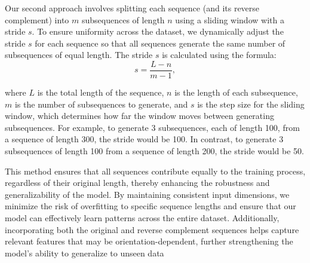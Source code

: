 Our second approach involves splitting each sequence (and its reverse complement) into $m$ subsequences of length $n$ using a sliding window with a stride $s$. To ensure uniformity across the dataset, we dynamically adjust the stride $s$ for each sequence so that all sequences generate the same number of subsequences of equal length. The stride $s$ is calculated using the formula:
$$  s = \frac{L-n} {m-1},$$

 
where $L$ is the total length of the sequence, $n$ is the length of each subsequence, 
$m$ is the number of subsequences to generate, and $s$ is the step size for the sliding window, which determines how far the window moves between generating subsequences. For example, to generate 3 subsequences, each of length 100, from a sequence of length 300, the stride would be 100. In contrast, to generate 3 subsequences of length 100 from a sequence of length 200, the stride would be 50.

This method ensures that all sequences contribute equally to the training process, regardless of their original length, thereby enhancing the robustness and generalizability of the model. By maintaining consistent input dimensions, we minimize the risk of overfitting to specific sequence lengths and ensure that our model can effectively learn patterns across the entire dataset. Additionally, incorporating both the original and reverse complement sequences helps capture relevant features that may be orientation-dependent, further strengthening the model’s ability to generalize to unseen data
 



